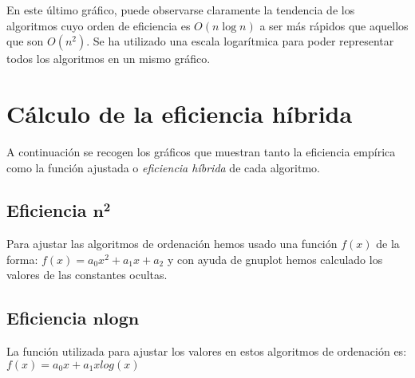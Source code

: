 \documentclass[11pt]{article}
\begin{document}
En este último gráfico, puede observarse claramente la tendencia de los algoritmos cuyo orden de eficiencia es $O(n\log n)$ a ser más rápidos que aquellos que son $O(n^2)$. Se ha utilizado una escala logarítmica para poder representar todos los algoritmos en un mismo gráfico.

\newpage



\section*{Cálculo de la eficiencia híbrida}
A continuación se recogen los gráficos que muestran tanto la eficiencia empírica como la función ajustada o \textit{eficiencia híbrida} de cada algoritmo.



\subsection*{Eficiencia $\boldsymbol{n^2}$}

Para ajustar las algoritmos de ordenación hemos usado una función $f(x)$ de la forma: $f(x) = a_0x^2 + a_1x + a_2$ y con ayuda de gnuplot hemos calculado los valores de las constantes ocultas. 

\begin{center}
	
\end{center}

\begin{center}
	
\end{center}

\begin{center}
	
\end{center}

\subsection*{Eficiencia $\boldsymbol{n log n}$}

La función utilizada para ajustar los valores en estos algoritmos de ordenación es: $f(x) = a_0x + a_1xlog(x)$

\begin{center}
	
\end{center}

\begin{center}
	
\end{center}
\end{document}
